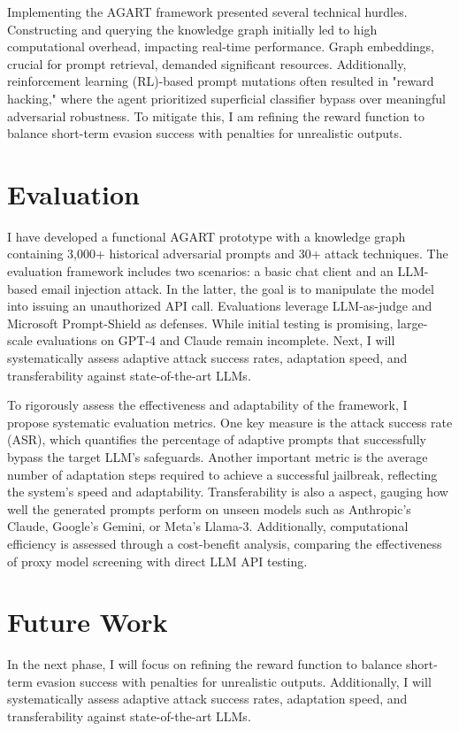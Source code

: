 Implementing the AGART framework presented several technical hurdles. Constructing and querying the knowledge graph initially led to high computational overhead, impacting real-time performance. Graph embeddings, crucial for prompt retrieval, demanded significant resources. Additionally, reinforcement learning (RL)-based prompt mutations often resulted in "reward hacking," where the agent prioritized superficial classifier bypass over meaningful adversarial robustness. To mitigate this, I am refining the reward function to balance short-term evasion success with penalties for unrealistic outputs.

\section{Evaluation}

I have developed a functional AGART prototype with a knowledge graph containing 3,000+ historical adversarial prompts and 30+ attack techniques. The evaluation framework includes two scenarios: a basic chat client and an LLM-based email injection attack. In the latter, the goal is to manipulate the model into issuing an unauthorized API call. Evaluations leverage LLM-as-judge and Microsoft Prompt-Shield as defenses. While initial testing is promising, large-scale evaluations on GPT-4 and Claude remain incomplete. Next, I will systematically assess adaptive attack success rates, adaptation speed, and transferability against state-of-the-art LLMs.

To rigorously assess the effectiveness and adaptability of the framework, I propose systematic evaluation metrics. One key measure is the attack success rate (ASR), which quantifies the percentage of adaptive prompts that successfully bypass the target LLM’s safeguards. Another important metric is the average number of adaptation steps required to achieve a successful jailbreak, reflecting the system’s speed and adaptability. Transferability is also a aspect, gauging how well the generated prompts perform on unseen models such as Anthropic’s Claude, Google’s Gemini, or Meta’s Llama-3. Additionally, computational efficiency is assessed through a cost-benefit analysis, comparing the effectiveness of proxy model screening with direct LLM API testing.

\section{Future Work}

In the next phase, I will focus on refining the reward function to balance short-term evasion success with penalties for unrealistic outputs. Additionally, I will systematically assess adaptive attack success rates, adaptation speed, and transferability against state-of-the-art LLMs.

